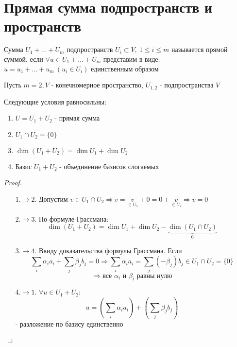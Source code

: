 \section{Прямая сумма подпространств и пространств}
    \begin{definition}
        Сумма $U_1+...+U_m$ подпространств $U_i \subset V, \ 1\leq i \leq m$ называется прямой суммой, если 
        $\forall u \in U_1+...+U_m$  представим в виде: \\$u = u_1+...+u_m \ (u_i \in U_i)$  единственным образом    
    \end{definition} 
    Пусть $m=2, V$ - конечномерное пространство, $U_{1,2}$ - подпространства $V$
    \begin{theorem}
        Следующие условия равносильны: 
        \begin{enumerate}
            \item $U = U_1 + U_2$ - прямая сумма
            \item $U_1 \cap U_2 = \{0\}$
            \item $\dim (U_1 + U_2) = \dim U_1 + \dim U_2$
            \item Базис $U_1 + U_2$ - объединение базисов слогаемых    
        \end{enumerate} 
    \end{theorem} 
    \begin{proof}\tab
        \begin{itemize}
            \item[$1. \to 2.$] Допустим $v \in U_1 \cap U_2 \Longrightarrow v = \underset{\in U_1}{v} + 0 = 0 + \underset{\in U_2}{v}  \Longrightarrow v = 0$
            \item[$2. \to 3.$] По формуле Грассмана: 
            $$\dim (U_1 + U_2) = \dim U_1 + \dim U_2 - \underbrace{\dim (U_1 \cap U_2)}_{0}$$
            \item[$3. \to 4.$] Ввиду доказательства формулы Грассмана. Если $$\sum \limits_{i} \alpha_i a_i + \sum \limits_{j} \beta_j b_j = 0 \Longrightarrow \sum \limits_{i} \alpha_i a_i = \sum \limits_{j} (-\beta_j) b_j \in U_1 \cap U_2 = \{0\}$$
            $$\Longrightarrow  \text{все } \alpha_i \text{ и } \beta_i \text{ равны нулю}$$
            \item[$4. \to 1.$] $\forall u \in U_1 + U_2: $ $$
            u = (\sum \limits_{i} \alpha_i a_i) + (\sum \limits_{j} \beta_j b_j)$$ 
            - разложение по базису единственно  
        \end{itemize}
    \end{proof}
